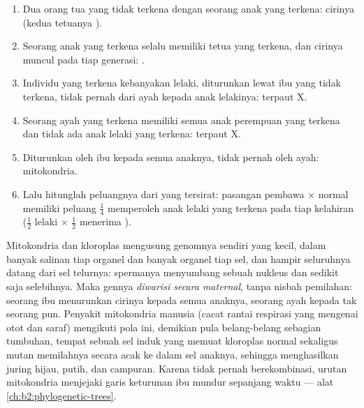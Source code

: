 \begin{method}\label{met:b2:meiosis-heredity:pedigree}
\begin{enumerate}
  \item Dua orang tua yang tidak terkena dengan seorang anak yang
        terkena: cirinya  (kedua tetuanya ).
  \item Seorang anak yang terkena selalu memiliki tetua yang terkena,
        dan cirinya muncul pada tiap generasi: .
  \item Individu yang terkena kebanyakan lelaki, diturunkan lewat ibu
        yang tidak terkena, tidak pernah dari ayah kepada anak
        lelakinya:  terpaut X.
  \item Seorang ayah yang terkena memiliki semua anak perempuan yang
        terkena dan tidak ada anak lelaki yang terkena: 
        terpaut X.
  \item Diturunkan oleh ibu kepada semua anaknya, tidak pernah oleh
        ayah: mitokondria.
  \item Lalu hitunglah peluangnya dari  yang tersirat:
        pasangan pembawa $\times$ normal memiliki peluang $\tfrac14$
        memperoleh anak lelaki yang terkena pada tiap kelahiran
        ($\tfrac12$ lelaki $\times$ $\tfrac12$ menerima ).
\end{enumerate}
\end{method}

\begin{definition}\label{def:b2:meiosis-heredity:extranuclear}
Mitokondria dan kloroplas mengusung genomnya sendiri yang kecil, dalam
banyak salinan tiap organel dan banyak organel tiap sel, dan hampir
seluruhnya datang dari sel telurnya: spermanya menyumbang sebuah
nukleus dan sedikit saja selebihnya. Maka gennya \emph{diwarisi secara
maternal}, tanpa nisbah pemilahan: seorang ibu menurunkan cirinya
kepada semua anaknya, seorang ayah kepada tak seorang pun. Penyakit
mitokondria manusia (cacat rantai respirasi yang mengenai otot dan
saraf) mengikuti pola ini, demikian pula belang-belang sebagian
tumbuhan, tempat sebuah sel induk yang memuat kloroplas normal sekaligus
mutan memilahnya secara acak ke dalam sel anaknya, sehingga
menghasilkan juring hijau, putih, dan campuran. Karena tidak pernah
berekombinasi, urutan mitokondria menjejaki garis keturunan ibu mundur
sepanjang waktu --- alat \cref{ch:b2:phylogenetic-trees}.
\end{definition}

